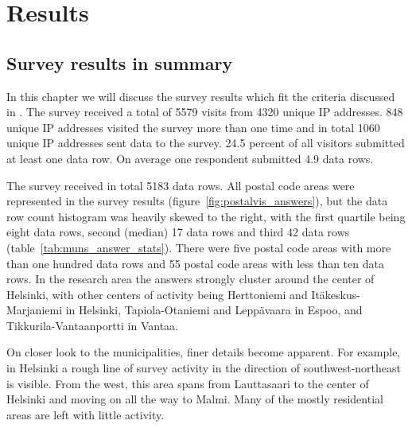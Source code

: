 \section{Results}
\subsection{Survey results in summary}
\justify

In this chapter we will discuss the survey results which fit the criteria discussed in \hyperref[sec:processdata]{}. The survey received a total of 5579 visits from 4320 unique IP addresses. 848 unique IP addresses visited the survey more than one time and in total 1060 unique IP addresses sent data to the survey. 24.5 percent of all visitors submitted at least one data row. On average one respondent submitted 4.9 data rows. 

The survey received in total 5183 data rows. All postal code areas were represented in the survey results (figure~\ref{fig:postalvis_answers}), but the data row count histogram was heavily skewed to the right, with the first quartile being eight data rows, second (median) 17 data rows and third 42 data rows (table~\ref{tab:muns_answer_stats}). There were five postal code areas with more than one hundred data rows and 55 postal code areas with less than ten data rows. In the research area the answers strongly cluster around the center of Helsinki, with other centers of activity being Herttoniemi and Itäkeskus-Marjaniemi in Helsinki, Tapiola-Otaniemi and Leppävaara in Espoo, and Tikkurila-Vantaanportti in Vantaa.

On closer look to the municipalities, finer details become apparent. For example, in Helsinki a rough line of survey activity in the direction of southwest-northeast is visible. From the west, this area spans from Lauttasaari to the center of Helsinki and moving on all the way to Malmi. Many of the mostly residential areas are left with little activity.

